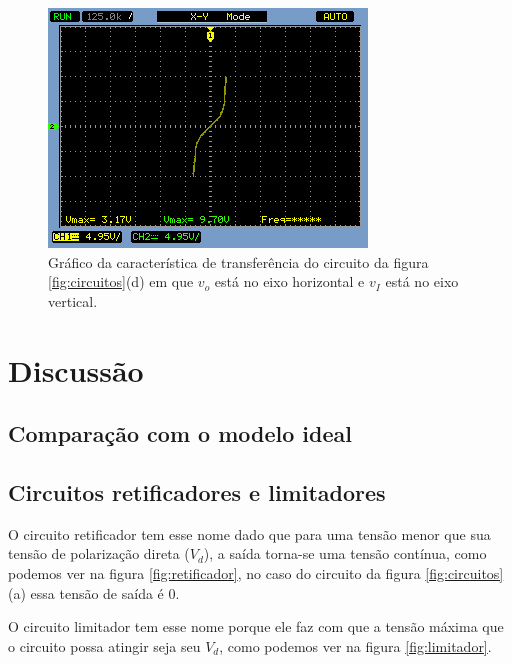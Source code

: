 \documentclass{abntex2}
\begin{document}
\begin{figure}[h]
  \centering
  \includegraphics[width=.8\textwidth]{diferenca-1d.png}
  \caption{Gráfico da característica de transferência do circuito da figura \ref{fig:circuitos}(d) em que $v_o$ está no eixo horizontal e $v_I$ está no eixo vertical.}
  \label{fig:diff4}
\end{figure}

\chapter{Discussão}

\section{Comparação com o modelo ideal}

\section{Circuitos retificadores e limitadores}

O circuito retificador tem esse nome dado que para uma tensão menor que sua tensão de polarização direta ($V_d$), a saída torna-se uma tensão contínua, como podemos ver na figura \ref{fig:retificador}, no caso do circuito da figura \ref{fig:circuitos}(a) essa tensão de saída é 0.

O circuito limitador tem esse nome porque ele faz com que a tensão máxima que o circuito possa atingir seja seu $V_d$, como podemos ver na figura \ref{fig:limitador}.
\end{document}
